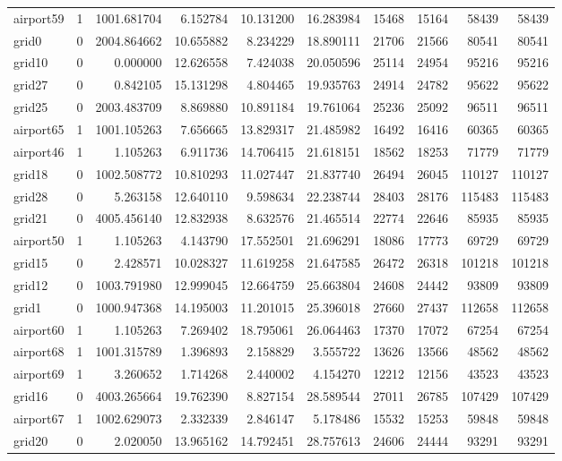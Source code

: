 \begin{longtable}{|l|r|r|r|r|r|r|r|r|r|}
airport59 & 1 & 1001.681704 & 6.152784 & 10.131200 & 16.283984 & 15468 & 15164 & 58439 & 58439 \\
grid0 & 0 & 2004.864662 & 10.655882 & 8.234229 & 18.890111 & 21706 & 21566 & 80541 & 80541 \\
grid10 & 0 & 0.000000 & 12.626558 & 7.424038 & 20.050596 & 25114 & 24954 & 95216 & 95216 \\
grid27 & 0 & 0.842105 & 15.131298 & 4.804465 & 19.935763 & 24914 & 24782 & 95622 & 95622 \\
grid25 & 0 & 2003.483709 & 8.869880 & 10.891184 & 19.761064 & 25236 & 25092 & 96511 & 96511 \\
airport65 & 1 & 1001.105263 & 7.656665 & 13.829317 & 21.485982 & 16492 & 16416 & 60365 & 60365 \\
airport46 & 1 & 1.105263 & 6.911736 & 14.706415 & 21.618151 & 18562 & 18253 & 71779 & 71779 \\
grid18 & 0 & 1002.508772 & 10.810293 & 11.027447 & 21.837740 & 26494 & 26045 & 110127 & 110127 \\
grid28 & 0 & 5.263158 & 12.640110 & 9.598634 & 22.238744 & 28403 & 28176 & 115483 & 115483 \\
grid21 & 0 & 4005.456140 & 12.832938 & 8.632576 & 21.465514 & 22774 & 22646 & 85935 & 85935 \\
airport50 & 1 & 1.105263 & 4.143790 & 17.552501 & 21.696291 & 18086 & 17773 & 69729 & 69729 \\
grid15 & 0 & 2.428571 & 10.028327 & 11.619258 & 21.647585 & 26472 & 26318 & 101218 & 101218 \\
grid12 & 0 & 1003.791980 & 12.999045 & 12.664759 & 25.663804 & 24608 & 24442 & 93809 & 93809 \\
grid1 & 0 & 1000.947368 & 14.195003 & 11.201015 & 25.396018 & 27660 & 27437 & 112658 & 112658 \\
airport60 & 1 & 1.105263 & 7.269402 & 18.795061 & 26.064463 & 17370 & 17072 & 67254 & 67254 \\
airport68 & 1 & 1001.315789 & 1.396893 & 2.158829 & 3.555722 & 13626 & 13566 & 48562 & 48562 \\
airport69 & 1 & 3.260652 & 1.714268 & 2.440002 & 4.154270 & 12212 & 12156 & 43523 & 43523 \\
grid16 & 0 & 4003.265664 & 19.762390 & 8.827154 & 28.589544 & 27011 & 26785 & 107429 & 107429 \\
airport67 & 1 & 1002.629073 & 2.332339 & 2.846147 & 5.178486 & 15532 & 15253 & 59848 & 59848 \\
grid20 & 0 & 2.020050 & 13.965162 & 14.792451 & 28.757613 & 24606 & 24444 & 93291 & 93291 \\

\end{longtable}
